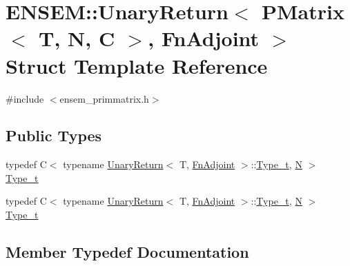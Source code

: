 \hypertarget{structENSEM_1_1UnaryReturn_3_01PMatrix_3_01T_00_01N_00_01C_01_4_00_01FnAdjoint_01_4}{}\section{E\+N\+S\+EM\+:\+:Unary\+Return$<$ P\+Matrix$<$ T, N, C $>$, Fn\+Adjoint $>$ Struct Template Reference}
\label{structENSEM_1_1UnaryReturn_3_01PMatrix_3_01T_00_01N_00_01C_01_4_00_01FnAdjoint_01_4}


{\ttfamily \#include $<$ensem\+\_\+primmatrix.\+h$>$}

\subsection*{Public Types}
\begin{DoxyCompactItemize}
\item 
typedef C$<$ typename \mbox{\hyperlink{structENSEM_1_1UnaryReturn}{Unary\+Return}}$<$ T, \mbox{\hyperlink{structENSEM_1_1FnAdjoint}{Fn\+Adjoint}} $>$\+::\mbox{\hyperlink{structENSEM_1_1UnaryReturn_3_01PMatrix_3_01T_00_01N_00_01C_01_4_00_01FnAdjoint_01_4_a048cd4378899462da7bbb8d274d24eb0}{Type\+\_\+t}}, \mbox{\hyperlink{operator__name__util_8cc_a7722c8ecbb62d99aee7ce68b1752f337}{N}} $>$ \mbox{\hyperlink{structENSEM_1_1UnaryReturn_3_01PMatrix_3_01T_00_01N_00_01C_01_4_00_01FnAdjoint_01_4_a048cd4378899462da7bbb8d274d24eb0}{Type\+\_\+t}}
\item 
typedef C$<$ typename \mbox{\hyperlink{structENSEM_1_1UnaryReturn}{Unary\+Return}}$<$ T, \mbox{\hyperlink{structENSEM_1_1FnAdjoint}{Fn\+Adjoint}} $>$\+::\mbox{\hyperlink{structENSEM_1_1UnaryReturn_3_01PMatrix_3_01T_00_01N_00_01C_01_4_00_01FnAdjoint_01_4_a048cd4378899462da7bbb8d274d24eb0}{Type\+\_\+t}}, \mbox{\hyperlink{operator__name__util_8cc_a7722c8ecbb62d99aee7ce68b1752f337}{N}} $>$ \mbox{\hyperlink{structENSEM_1_1UnaryReturn_3_01PMatrix_3_01T_00_01N_00_01C_01_4_00_01FnAdjoint_01_4_a048cd4378899462da7bbb8d274d24eb0}{Type\+\_\+t}}
\end{DoxyCompactItemize}


\subsection{Member Typedef Documentation}
\mbox{\label{structENSEM_1_1UnaryReturn_3_01PMatrix_3_01T_00_01N_00_01C_01_4_00_01FnAdjoint_01_4_a048cd4378899462da7bbb8d274d24eb0}} 
